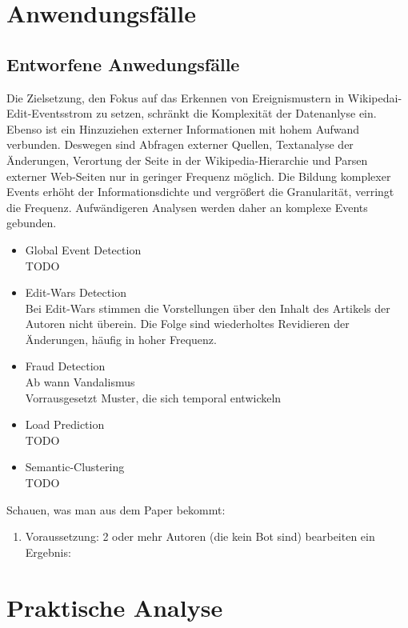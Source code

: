 \section{Anwendungsfälle}
\subsection{Entworfene Anwedungsfälle}
Die Zielsetzung, den Fokus auf das Erkennen von Ereignismustern in Wikipedai-Edit-Eventsstrom zu setzen, schränkt die Komplexität der Datenanlyse ein. Ebenso ist ein Hinzuziehen externer Informationen mit hohem Aufwand verbunden. Deswegen sind Abfragen externer Quellen, Textanalyse der Änderungen, Verortung der Seite in der Wikipedia-Hierarchie und Parsen externer Web-Seiten nur in geringer Frequenz möglich. Die Bildung komplexer Events erhöht der Informationsdichte und vergrößert die Granularität, verringt die Frequenz. Aufwändigeren Analysen werden daher an komplexe Events gebunden.

\begin{itemize}
    \item Global Event Detection\\ TODO
    \item Edit-Wars Detection\\ Bei Edit-Wars stimmen die Vorstellungen über den Inhalt des Artikels der Autoren nicht überein. Die Folge sind wiederholtes Revidieren der Änderungen, häufig in hoher Frequenz.
    \item Fraud Detection\\Ab wann Vandalismus \\Vorrausgesetzt Muster, die sich temporal entwickeln
    \item Load Prediction\\ TODO
    \item Semantic-Clustering\\ TODO
\end{itemize}


Schauen, was man aus dem Paper bekommt: \cite{10.1007978-3-642-36973-5_22}

\begin{enumerate}
    \item
    Voraussetzung: 2 oder mehr Autoren (die kein Bot sind) bearbeiten ein
    Ergebnis:
\end{enumerate}




\section{Praktische Analyse}

